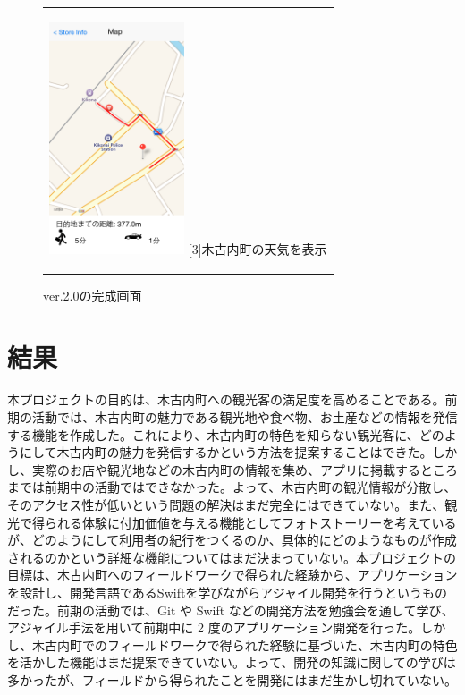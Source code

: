 \documentclass[openany,11pt,papersize]{jsbook}
\begin{document}
\begin{figure}[htbp]
\begin{center}
\begin{tabular}{c}
      \begin{minipage}{0.33\hsize}
        \begin{center}
\includegraphics[width=4cm, bb=0 0 320 548]{5.4_route.png}
          \hspace{1cm} [3]木古内町の天気を表示
        \end{center}
      \end{minipage}

    \end{tabular}
    \caption{ver.2.0の完成画面}
    \label{fig:lena}
  \end{center}
\end{figure}


\chapter{結果}
本プロジェクトの目的は、木古内町への観光客の満足度を高めることである。前期の活動では、木古内町の魅力である観光地や食べ物、お土産などの情報を発信する機能を作成した。これにより、木古内町の特色を知らない観光客に、どのようにして木古内町の魅力を発信するかという方法を提案することはできた。しかし、実際のお店や観光地などの木古内町の情報を集め、アプリに掲載するところまでは前期中の活動ではできなかった。よって、木古内町の観光情報が分散し、そのアクセス性が低いという問題の解決はまだ完全にはできていない。また、観光で得られる体験に付加価値を与える機能としてフォトストーリーを考えているが、どのようにして利用者の紀行をつくるのか、具体的にどのようなものが作成されるのかという詳細な機能についてはまだ決まっていない。本プロジェクトの目標は、木古内町へのフィールドワークで得られた経験から、アプリケーションを設計し、開発言語であるSwiftを学びながらアジャイル開発を行うというものだった。前期の活動では、Git や Swift などの開発方法を勉強会を通して学び、アジャイル手法を用いて前期中に 2 度のアプリケーション開発を行った。しかし、木古内町でのフィールドワークで得られた経験に基づいた、木古内町の特色を活かした機能はまだ提案できていない。よって、開発の知識に関しての学びは多かったが、フィールドから得られたことを開発にはまだ生かし切れていない。
\end{document}
